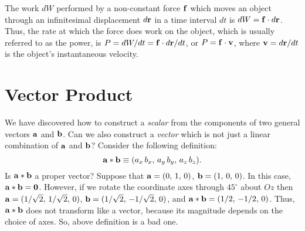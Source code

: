 The work $dW$ performed by a non-constant force ${\bf f}$ which moves an
object through an infinitesimal displacement $d{\bf r}$ in a time interval $dt$ is $dW={\bf f}\cdot d{\bf r}$. Thus, the rate at which the force does
work on the object, which is usually referred to as the power, is
$P = dW/dt = {\bf f}\cdot d{\bf r}/dt$, or $P={\bf f}\cdot {\bf v}$,
where ${\bf v} = d{\bf r}/dt$ is the object's instantaneous velocity.

\section{Vector Product}\label{svecp}
We have discovered how to construct a {\em scalar}\/ from the components of two
general vectors $\bf a$ and $\bf b$. Can we also construct a {\em vector}\/ which is not
just a linear combination of $\bf a$ and $\bf b$? Consider the following definition:
\begin{equation}
{\bf a} \ast{\bf b} \equiv (a_x \,b_x,\, a_y\, b_y,\, a_z \,b_z).
\end{equation}
Is ${\bf a} \ast {\bf b}$ a proper vector? Suppose  that ${\bf a} =
(0,\,1,\,0)$, ${\bf b} = (1,\,0,\,0)$. In this case,  ${\bf a} \ast {\bf b}= {\bf 0}$.
However, if we rotate the coordinate axes through $45^\circ$ about $Oz$ then
${\bf a} = (1/\sqrt{2},\, 1/\sqrt{2},\, 0)$, ${\bf b} = (1/\sqrt{2},\, -1/\sqrt{2},\,0)$,
and ${\bf a}\ast {\bf b} = (1/2,\, -1/2,\,0)$. Thus, ${\bf a}\ast {\bf b}$ does
not transform like a vector, because its magnitude depends on the choice of axes.
So, above definition is a bad one.

